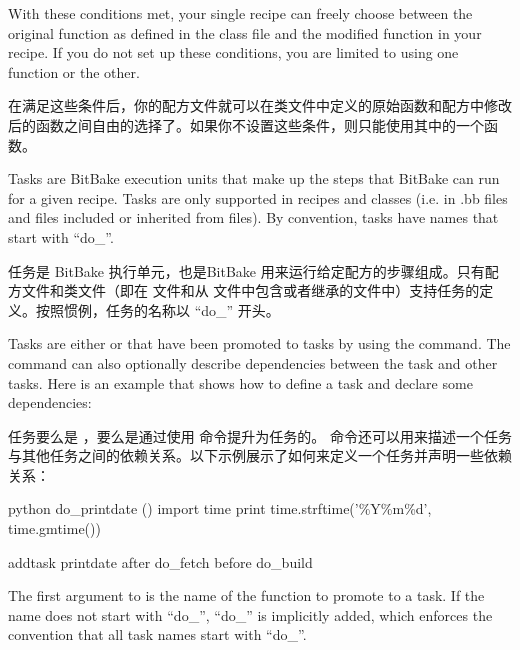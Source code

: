 With these conditions met, your single recipe can freely choose between the original function as defined in the class file and the modified function in your recipe. If you do not set up these conditions, you are limited to using one function or the other.

在满足这些条件后，你的配方文件就可以在类文件中定义的原始函数和配方中修改后的函数之间自由的选择了。如果你不设置这些条件，则只能使用其中的一个函数。

\label{section:Tasks}

Tasks are BitBake execution units that make up the steps that BitBake can run for a given recipe. Tasks are only supported in recipes and classes (i.e. in .bb files and files included or inherited from  files). By convention, tasks have names that start with ``do\_''.

任务是 BitBake 执行单元，也是BitBake 用来运行给定配方的步骤组成。只有配方文件和类文件（即在  文件和从  文件中包含或者继承的文件中）支持任务的定义。按照惯例，任务的名称以 ``do\_'' 开头。


Tasks are either  or  that have been promoted to tasks by using the  command. The  command can also optionally describe dependencies between the task and other tasks. Here is an example that shows how to define a task and declare some dependencies:

任务要么是 ，要么是通过使用  命令提升为任务的。 命令还可以用来描述一个任务与其他任务之间的依赖关系。以下示例展示了如何来定义一个任务并声明一些依赖关系：

\begin{pyglist}
python do_printdate () {
    import time
    print time.strftime('\%Y\%m\%d', time.gmtime())
}

addtask printdate after do_fetch before do_build
\end{pyglist}

The first argument to  is the name of the function to promote to a task. If the name does not start with ``do\_'', ``do\_'' is implicitly added, which enforces the convention that all task names start with ``do\_''.


